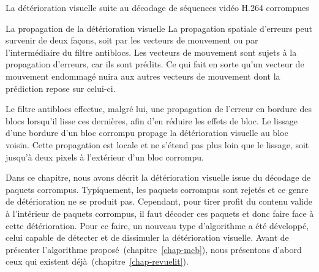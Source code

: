 \begin{chapter}{La détérioration visuelle suite au décodage de séquences vidéo H.264 corrompues}
\begin{section}{La propagation de la détérioration visuelle}
La propagation spatiale d'erreurs peut survenir de deux façons, soit par les
vecteurs de mouvement ou par l'intermédiaire du filtre antiblocs. Les vecteurs
de mouvement sont sujets à la propagation d'erreurs, car ils sont prédits. Ce
qui fait en sorte qu'un vecteur de mouvement endommagé nuira aux autres vecteurs de
mouvement dont la prédiction repose sur celui-ci.

Le filtre antiblocs effectue, malgré lui, une propagation de l'erreur en bordure
des blocs lorsqu'il lisse ces dernières, afin d'en réduire les effets de bloc.
Le lissage d'une bordure d'un bloc corrompu propage la détérioration visuelle au
bloc voisin. Cette propagation est locale et ne s'étend pas plus loin que le
lissage, soit jusqu'à deux pixels à l'extérieur d'un bloc corrompu.
\end{section}

Dans ce chapitre, nous avons décrit la détérioration visuelle issue du décodage
de paquets corrompus. Typiquement, les paquets corrompus sont rejetés et ce
genre de détérioration ne se produit pas. Cependant, pour tirer profit du
contenu valide à l'intérieur de paquets corrompus, il faut décoder ces paquets
et donc faire face à cette détérioration. Pour ce faire, un nouveau type
d'algorithme a été développé, celui capable de détecter et de dissimuler la
détérioration visuelle. Avant de présenter l'algorithme
proposé~(chapitre~\ref{chap-mcb}), nous présentons d'abord ceux qui existent
déjà~(chapitre~\ref{chap-revuelit}).
\end{chapter}